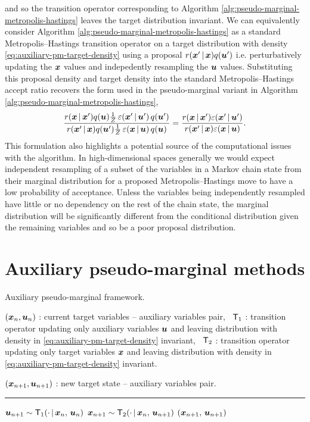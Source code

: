 and so the transition operator corresponding to Algorithm \ref{alg:pseudo-marginal-metropolis-hastings} leaves the target distribution invariant. We can equivalently consider Algorithm \ref{alg:pseudo-marginal-metropolis-hastings} as a standard Metropolis--Hastings transition operator on a target distribution with density  \eqref{eq:auxiliary-pm-target-density} using a proposal $r(\boldsymbol{x}'\operatorname{|}\boldsymbol{x})q(\boldsymbol{u}')$ i.e. perturbatively updating the $\boldsymbol{x}$ values and indepedently resampling the $\boldsymbol{u}$ values. Substituting this proposal density and target density into the standard Metropolis--Hastings accept ratio recovers the form used in the pseudo-marginal variant in Algorithm \ref{alg:pseudo-marginal-metropolis-hastings},
\begin{equation}
\frac
  {r(\boldsymbol{x}\operatorname{|}\boldsymbol{x}')q(\boldsymbol{u})  \frac{1}{Z} \,\varepsilon(\boldsymbol{x}'\operatorname{|}\boldsymbol{u}')\,q(\boldsymbol{u}')}
  {r(\boldsymbol{x}'\operatorname{|}\boldsymbol{x})q(\boldsymbol{u}')  \frac{1}{Z} \,\varepsilon(\boldsymbol{x}\operatorname{|}\boldsymbol{u})\,q(\boldsymbol{u})}
  =
\frac
  {r(\boldsymbol{x}\operatorname{|}\boldsymbol{x}')\varepsilon(\boldsymbol{x}'\operatorname{|}\boldsymbol{u}')}
  {r(\boldsymbol{x}'\operatorname{|}\boldsymbol{x})\varepsilon(\boldsymbol{x}\operatorname{|}\boldsymbol{u})}.
\end{equation}
This formulation also highlights a potential source of the computational issues with the algorithm. In high-dimensional spaces generally we would expect independent resampling of a subset of the variables in a Markov chain state from their marginal distribution for a proposed Metropolis--Hastings move to have a low probability of acceptance.  Unless the variables being independently resampled have little or no dependency on the rest of the chain state, the marginal distribution will be significantly different from the conditional distribution given the remaining variables and so be a poor proposal distribution.

\section{Auxiliary pseudo-marginal methods}

\begin{algorithm}[!t]
\caption{Auxiliary pseudo-marginal framework.}
\label{alg:auxiliary-pseudo-marginal}
\begin{algorithmic}
\small
    \Require
    $(\boldsymbol{x}_n, \boldsymbol{u}_n)$ : current target variables -- auxiliary variables pair,~
    $\mathsf{T}_1$ : transition operator updating only auxiliary variables $\boldsymbol{u}$ and leaving distribution with density in \eqref{eq:auxiliary-pm-target-density} invariant,~
    $\mathsf{T}_2$ : transition operator updating only target variables $\boldsymbol{x}$ and leaving distribution with density in \eqref{eq:auxiliary-pm-target-density} invariant.
    \Ensure\raggedright
    $(\boldsymbol{x}_{n+1}, \boldsymbol{u}_{n+1})$ : new target state  -- auxiliary variables pair.
\end{algorithmic}
\hrule
\small
\begin{algorithmic}[1]
  \State $\boldsymbol{u}_{n+1} \sim \mathsf{T}_1(\cdot \operatorname{|} \boldsymbol{x}_n,\,\boldsymbol{u}_n)$
  \State $\boldsymbol{x}_{n+1} \sim \mathsf{T}_2(\cdot \operatorname{|} \boldsymbol{x}_n,\,\boldsymbol{u}_{n+1})$
  \State \Return $(\boldsymbol{x}_{n+1},\, \boldsymbol{u}_{n+1})$
\end{algorithmic}
\end{algorithm}

